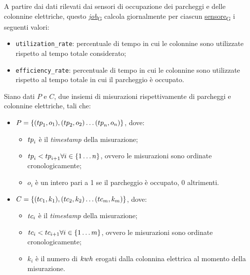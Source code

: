 A partire dai dati rilevati dai sensori di occupazione dei parcheggi e delle colonnine elettriche, questo \href{https://7last.github.io/docs/pb/documentazione-interna/glossario\#job}{\textit{job}\textsubscript{G}} calcola giornalmente per ciascun \href{https://7last.github.io/docs/pb/documentazione-interna/glossario\#sensore}{sensore\textsubscript{G}} i seguenti valori:
\begin{itemize}
	\item \texttt{utilization\_rate}: percentuale di tempo in cui le colonnine sono utilizzate rispetto al tempo totale considerato;
	\item \texttt{efficiency\_rate}: percentuale di tempo in cui le colonnine sono utilizzate rispetto al tempo totale in cui il parcheggio è occupato.
\end{itemize}

Siano dati $P$ e $C$, due insiemi di misurazioni rispettivamente di parcheggi e colonnine elettriche, tali che:
\begin{itemize}
	\item $P = \{({tp}_1, o_1), ({tp}_2, o_2)\ldots ({tp}_n, o_n)\}$, dove:
	      \begin{itemize}
		      \item ${tp}_i$ è il \textit{timestamp} della misurazione;
		      \item ${tp}_i < {tp}_{i+1}\forall i\in\{1\ldots n\}$, ovvero le misurazioni sono ordinate cronologicamente;
		      \item $o_i$ è un intero pari a 1 se il parcheggio è occupato, 0 altrimenti.
	      \end{itemize}
	\item $C = \{({tc}_1, k_1), ({tc}_2, k_2)\ldots ({tc}_m, k_m)\}$, dove:
	      \begin{itemize}
		      \item ${tc}_i$ è il \textit{timestamp} della misurazione;
		      \item ${tc}_i < {tc}_{i+1}\forall i\in\{1\ldots m\}$, ovvero le misurazioni sono ordinate cronologicamente;
		      \item $k_i$ è il numero di ${kwh}$ erogati dalla colonnina elettrica al momento della misurazione.
	      \end{itemize}
\end{itemize}

